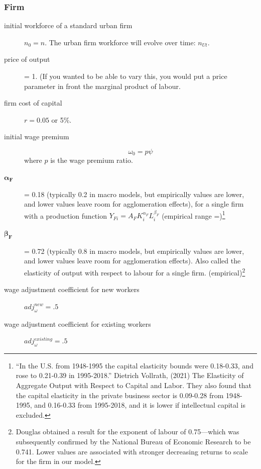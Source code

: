 \subsubsection{Firm}
\begin{description}
\item [initial workforce of a standard urban firm] $n_0=n$.  The urban firm workforce will evolve over time: $n_{Ut}$. 

\item [price of output] = 1. (If you wanted to be able to vary this, you would put a price parameter in front the %
\gls{marginal product of labour}. %

\item [firm cost of capital] $r = 0.05$ or 5\%.

\item [initial wage premium]  \[\omega_0 = p \psi\] where $p$ is the wage premium ratio.

\item  [$\mathbf{\alpha_F}$] = 0.18 (typically 0.2 in macro models, but empirically values are lower, and lower values leave room for agglomeration effects),  for a single firm with a production function $Y_{Fi}=A_F K_i^{\alpha_F }L^{\beta_F}_i$ (empirical range =)\footnote{``In the U.S. from 1948-1995 the capital elasticity bounds were 0.18-0.33, and rose to 0.21-0.39 in 1995-2018.'' Dietrich Vollrath, (2021) The Elasticity of Aggregate Output with Respect to Capital and Labor. They also found that the capital elasticity in the private business sector is 0.09-0.28 from 1948-1995, and 0.16-0.33 from 1995-2018, and it is lower if intellectual capital is excluded.}

\item  [$\mathbf{\beta_F}$] = 0.72 (typically 0.8 in macro models, but empirically values are lower, and lower values leave room for agglomeration effects). Also called the elasticity of output with respect to labour for a single firm. (empirical)\footnote{Douglas  obtained a result for the exponent of labour of 0.75—which was subsequently confirmed by the National Bureau of Economic Research to be 0.741. Lower values  are associated with stronger decreasing returns to scale for the firm in our model.} 

\item [wage adjustment coefficient for new workers ] $adj^{new}_\omega=.5$

\item [wage adjustment coefficient for existing workers] $adj^{existing}_\omega=.5$
\end{description}
    

